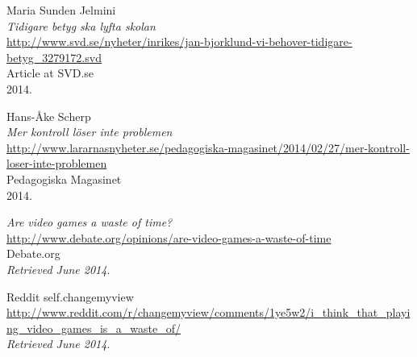   Maria Sunden Jelmini \\
  \emph{Tidigare betyg ska lyfta skolan} \\
  \url{http://www.svd.se/nyheter/inrikes/jan-bjorklund-vi-behover-tidigare-betyg_3279172.svd} \\
  Article at SVD.se \\
  2014.

  Hans-Åke Scherp \\
  \emph{
Mer kontroll löser inte problemen} \\
  \url{http://www.lararnasnyheter.se/pedagogiska-magasinet/2014/02/27/mer-kontroll-loser-inte-problemen} \\
  Pedagogiska Magasinet \\
  2014.

  \emph{Are video games a waste of time?} \\
  \url{http://www.debate.org/opinions/are-video-games-a-waste-of-time} \\
  Debate.org \\
  \emph{Retrieved June 2014}.

  Reddit self.changemyview \\
  \url{http://www.reddit.com/r/changemyview/comments/1ye5w2/i_think_that_playing_video_games_is_a_waste_of/} \\
  \emph{Retrieved June 2014}.
